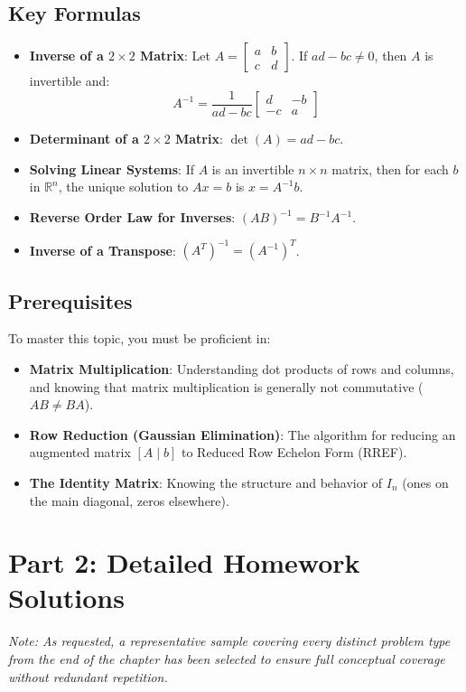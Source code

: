 \documentclass[12pt]{article}
\begin{document}
\subsection{Key Formulas}
\begin{itemize}
    \item \textbf{Inverse of a $2 \times 2$ Matrix}: Let $A = \begin{bmatrix} a & b \\ c & d \end{bmatrix}$. If $ad - bc \neq 0$, then $A$ is invertible and:
    \[ A^{-1} = \frac{1}{ad - bc} \begin{bmatrix} d & -b \\ -c & a \end{bmatrix} \]
    \item \textbf{Determinant of a $2 \times 2$ Matrix}: $\det(A) = ad - bc$.
    \item \textbf{Solving Linear Systems}: If $A$ is an invertible $n \times n$ matrix, then for each $b$ in $\mathbb{R}^n$, the unique solution to $Ax = b$ is $x = A^{-1}b$.
    \item \textbf{Reverse Order Law for Inverses}: $(AB)^{-1} = B^{-1}A^{-1}$.
    \item \textbf{Inverse of a Transpose}: $(A^T)^{-1} = (A^{-1})^T$.
\end{itemize}

\subsection{Prerequisites}
To master this topic, you must be proficient in:
\begin{itemize}
    \item \textbf{Matrix Multiplication}: Understanding dot products of rows and columns, and knowing that matrix multiplication is generally not commutative ($AB \neq BA$).
    \item \textbf{Row Reduction (Gaussian Elimination)}: The algorithm for reducing an augmented matrix $[A \mid b]$ to Reduced Row Echelon Form (RREF).
    \item \textbf{The Identity Matrix}: Knowing the structure and behavior of $I_n$ (ones on the main diagonal, zeros elsewhere).
\end{itemize}

\newpage
\section{Part 2: Detailed Homework Solutions}
\textit{Note: As requested, a representative sample covering every distinct problem type from the end of the chapter has been selected to ensure full conceptual coverage without redundant repetition.}
\end{document}
